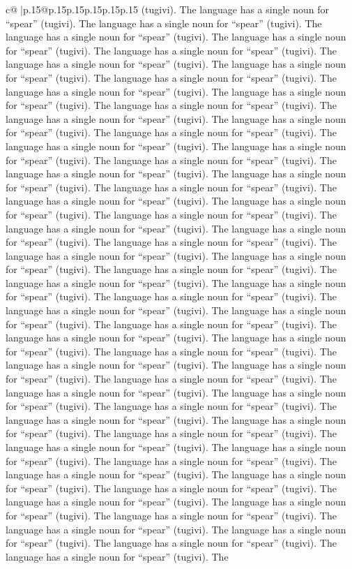 \documentclass{article}
\begin{document}
{\begin{supertabular}{c@{$\;$}|p{.15\linewidth}@{}p{.15\linewidth}p{.15\linewidth}p{.15\linewidth}p{.15\linewidth}p{.15\linewidth}}
{{{(tugivi). The language has a single noun for “spear” (tugivi). The language has a single noun for “spear” (tugivi). The language has a single noun for “spear” (tugivi). The language has a single noun for “spear” (tugivi). The language has a single noun for “spear” (tugivi). The language has a single noun for “spear” (tugivi). The language has a single noun for “spear” (tugivi). The language has a single noun for “spear” (tugivi). The language has a single noun for “spear” (tugivi). The language has a single noun for “spear” (tugivi). The language has a single noun for “spear” (tugivi). The language has a single noun for “spear” (tugivi). The language has a single noun for “spear” (tugivi). The language has a single noun for “spear” (tugivi). The language has a single noun for “spear” (tugivi). The language has a single noun for “spear” (tugivi). The language has a single noun for “spear” (tugivi). The language has a single noun for “spear” (tugivi). The language has a single noun for “spear” (tugivi). The language has a single noun for “spear” (tugivi). The language has a single noun for “spear” (tugivi). The language has a single noun for “spear” (tugivi). The language has a single noun for “spear” (tugivi). The language has a single noun for “spear” (tugivi). The language has a single noun for “spear” (tugivi). The language has a single noun for “spear” (tugivi). The language has a single noun for “spear” (tugivi). The language has a single noun for “spear” (tugivi). The language has a single noun for “spear” (tugivi). The language has a single noun for “spear” (tugivi). The language has a single noun for “spear” (tugivi). The language has a single noun for “spear” (tugivi). The language has a single noun for “spear” (tugivi). The language has a single noun for “spear” (tugivi). The language has a single noun for “spear” (tugivi). The language has a single noun for “spear” (tugivi). The language has a single noun for “spear” (tugivi). The language has a single noun for “spear” (tugivi). The language has a single noun for “spear” (tugivi). The language has a single noun for “spear” (tugivi). The language has a single noun for “spear” (tugivi). The language has a single noun for “spear” (tugivi). The language has a single noun for “spear” (tugivi). The language has a single noun for “spear” (tugivi). The language has a single noun for “spear” (tugivi). The language has a single noun for “spear” (tugivi). The language has a single noun for “spear” (tugivi). The language has a single noun for “spear” (tugivi). The language has a single noun for “spear” (tugivi). The language has a single noun for “spear” (tugivi). The language has a single noun for “spear” (tugivi). The language has a single noun for “spear” (tugivi). The language has a single noun for “spear” (tugivi). The language has a single noun for “spear” (tugivi). The language has a single noun for “spear” (tugivi). The language has a single noun for “spear” (tugivi). The language has a single noun for “spear” (tugivi). The language has a single noun for “spear” (tugivi). The language has a single noun for “spear” (tugivi). The language has a single noun for “spear” (tugivi). The }}}
\end{supertabular}}
\end{document}

